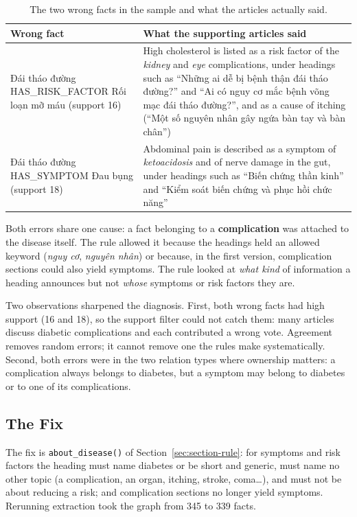 \documentclass[11pt, a4paper]{article}
\newcommand{\code}[1]{\texttt{#1}}
\begin{document}
\begin{table}[H]
\centering
\small
\caption{The two wrong facts in the sample and what the articles actually said.}
\label{tab:errors}
\begin{tabularx}{\textwidth}{l X}
\toprule
Wrong fact & What the supporting articles said \\
\midrule
Đái tháo đường HAS\_RISK\_FACTOR Rối loạn mỡ máu (support 16) & High cholesterol is listed as a risk factor of the \emph{kidney} and \emph{eye} complications, under headings such as ``Những ai dễ bị bệnh thận đái tháo đường?'' and ``Ai có nguy cơ mắc bệnh võng mạc đái tháo đường?'', and as a cause of itching (``Một số nguyên nhân gây ngứa bàn tay và bàn chân'') \\
\addlinespace
Đái tháo đường HAS\_SYMPTOM Đau bụng (support 18) & Abdominal pain is described as a symptom of \emph{ketoacidosis} and of nerve damage in the gut, under headings such as ``Biến chứng thần kinh'' and ``Kiểm soát biến chứng và phục hồi chức năng'' \\
\bottomrule
\end{tabularx}
\end{table}

Both errors share one cause: a fact belonging to a \textbf{complication} was attached to the disease itself. The rule allowed it because the headings held an allowed keyword (\emph{nguy cơ}, \emph{nguyên nhân}) or because, in the first version, complication sections could also yield symptoms. The rule looked at \emph{what kind} of information a heading announces but not \emph{whose} symptoms or risk factors they are.

Two observations sharpened the diagnosis. First, both wrong facts had high support (16 and 18), so the support filter could not catch them: many articles discuss diabetic complications and each contributed a wrong vote. Agreement removes random errors; it cannot remove one the rules make systematically. Second, both errors were in the two relation types where ownership matters: a complication always belongs to diabetes, but a symptom may belong to diabetes or to one of its complications.

\subsection{The Fix}

The fix is \code{about\_disease()} of Section~\ref{sec:section-rule}: for symptoms and risk factors the heading must name diabetes or be short and generic, must name no other topic (a complication, an organ, itching, stroke, coma\ldots), and must not be about reducing a risk; and complication sections no longer yield symptoms. Rerunning extraction took the graph from 345 to 339 facts.
\end{document}
